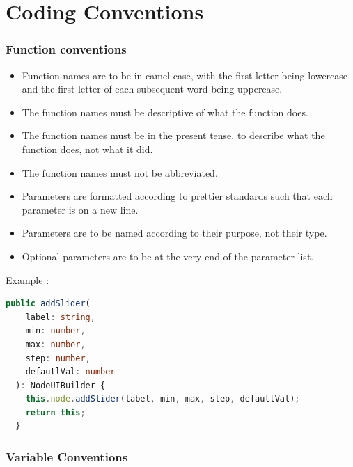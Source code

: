 \documentclass[11pt,a4paper]{article}
\begin{document}
\section*{Coding Conventions}

\subsubsection*{Function conventions}

\begin{itemize}
    \item[\textbullet] Function names are to be in camel case, with the first letter being lowercase and the first letter of each subsequent word being uppercase.
    \item[\textbullet] The function names must be descriptive of what the function does.
    \item[\textbullet] The function names must be in the present tense, to describe what the function does, not what it did.
    \item[\textbullet] The function names must not be abbreviated.
    \item[\textbullet] Parameters are formatted according to prettier standards such that each parameter is on a new line.
    \item[\textbullet] Parameters are to be named according to their purpose, not their type.
    \item[\textbullet] Optional parameters are to be at the very end of the parameter list.
\end{itemize}

Example : 

\begin{lstlisting}[language=TypeScript]
  public addSlider(
    label: string,
    min: number,
    max: number,
    step: number,
    defautlVal: number
  ): NodeUIBuilder {
    this.node.addSlider(label, min, max, step, defautlVal);
    return this;
  }

\end{lstlisting}

\subsubsection*{Variable Conventions}
\end{document}
